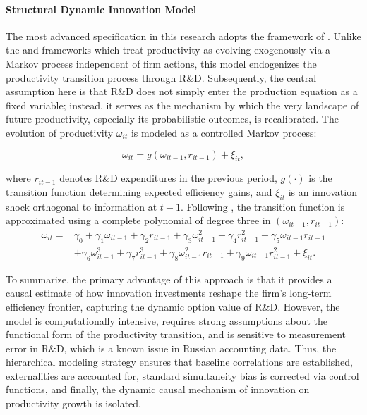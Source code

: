\documentclass[a4paper, 12pt]{article}
\begin{document}
\paragraph{Structural Dynamic Innovation Model}

The most advanced specification in this research adopts the framework of \textcite{doraszelski2013r}. Unlike the \textcite{olley1992dynamics}  and \textcite{levinsohn2003estimating} frameworks which treat productivity as evolving exogenously via a Markov process independent of firm actions, this model endogenizes the productivity transition process through R\&D. Subsequently, the central assumption here is that R\&D does not simply enter the production equation as a fixed variable; instead, it serves as the mechanism by which the very landscape of future productivity, especially its probabilistic outcomes, is recalibrated. The evolution of productivity $\omega_{it}$ is modeled as a controlled Markov process:

\begin{equation}
\omega_{it} = g(\omega_{it-1}, r_{it-1}) + \xi_{it},
\end{equation}

\noindent where $r_{it-1}$ denotes R\&D expenditures in the previous period, $g(\cdot)$ is the transition function determining expected efficiency gains, and $\xi_{it}$ is an innovation shock orthogonal to information at $t-1$. Following \textcite{doraszelski2013r}, the transition function is approximated using a complete polynomial of degree three in $(\omega_{it-1}, r_{it-1})$:
\begin{equation}
\begin{split}
\omega_{it} = {} & \gamma_0 + \gamma_1 \omega_{it-1} + \gamma_2 r_{it-1}
 + \gamma_3 \omega_{it-1}^2 + \gamma_4 r_{it-1}^2
 + \gamma_5 \omega_{it-1} r_{it-1} \\
 & + \gamma_6 \omega_{it-1}^3 + \gamma_7 r_{it-1}^3
 + \gamma_8 \omega_{it-1}^2 r_{it-1}
 + \gamma_9 \omega_{it-1} r_{it-1}^2
 + \xi_{it}.
\end{split}
\label{eq:dj_transition}
\end{equation}

To summarize, the primary advantage of this approach is that it provides a causal estimate of how innovation investments reshape the firm's long-term efficiency frontier, capturing the dynamic option value of R\&D. However, the model is computationally intensive, requires strong assumptions about the functional form of the productivity transition, and is sensitive to measurement error in R\&D, which is a known issue in Russian accounting data. Thus, the hierarchical modeling strategy ensures that baseline correlations are established, externalities are accounted for, standard simultaneity bias is corrected via control functions, and finally, the dynamic causal mechanism of innovation on productivity growth is isolated.
\end{document}
